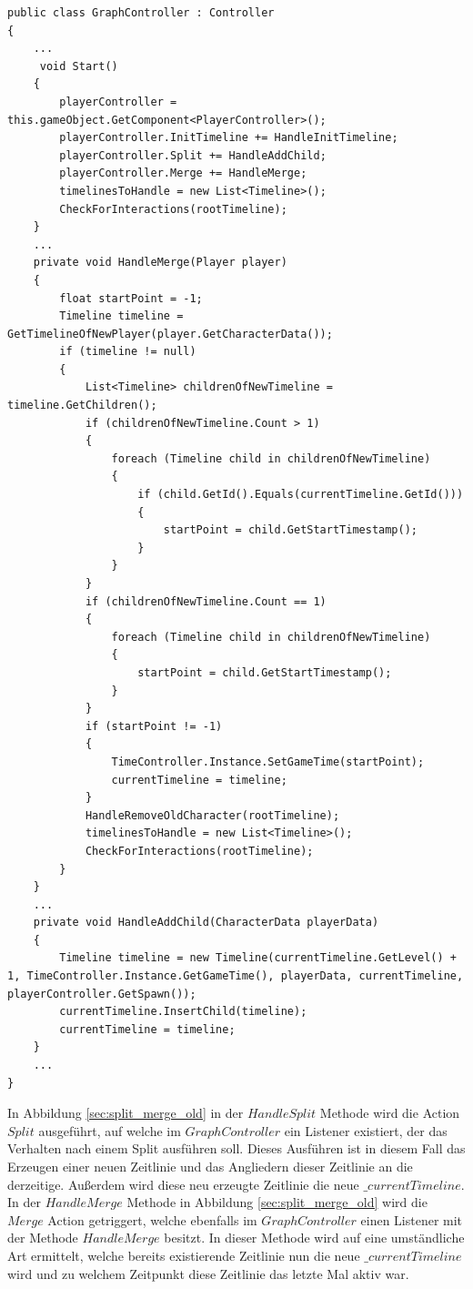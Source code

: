 \begin{lstlisting}[caption={Split und Merge listener}, label={sec:split_merge_old_graph}]
public class GraphController : Controller
{
    ...
     void Start()
    {
        playerController = this.gameObject.GetComponent<PlayerController>();
        playerController.InitTimeline += HandleInitTimeline;
        playerController.Split += HandleAddChild;
        playerController.Merge += HandleMerge;
        timelinesToHandle = new List<Timeline>();
        CheckForInteractions(rootTimeline);
    }
    ...
    private void HandleMerge(Player player)
    {
        float startPoint = -1;
        Timeline timeline = GetTimelineOfNewPlayer(player.GetCharacterData());
        if (timeline != null)
        {
            List<Timeline> childrenOfNewTimeline = timeline.GetChildren();
            if (childrenOfNewTimeline.Count > 1)
            {
                foreach (Timeline child in childrenOfNewTimeline)
                {
                    if (child.GetId().Equals(currentTimeline.GetId()))
                    {
                        startPoint = child.GetStartTimestamp();
                    }
                }
            }
            if (childrenOfNewTimeline.Count == 1)
            {
                foreach (Timeline child in childrenOfNewTimeline)
                {
                    startPoint = child.GetStartTimestamp();
                }
            }
            if (startPoint != -1)
            {
                TimeController.Instance.SetGameTime(startPoint);
                currentTimeline = timeline;
            }
            HandleRemoveOldCharacter(rootTimeline);
            timelinesToHandle = new List<Timeline>();
            CheckForInteractions(rootTimeline);
        }
    }
    ...
    private void HandleAddChild(CharacterData playerData)
    {
        Timeline timeline = new Timeline(currentTimeline.GetLevel() + 1, TimeController.Instance.GetGameTime(), playerData, currentTimeline, playerController.GetSpawn());
        currentTimeline.InsertChild(timeline);
        currentTimeline = timeline;
    }
    ...
}
\end{lstlisting}

In Abbildung \ref{sec:split_merge_old} in der $HandleSplit$ Methode wird die Action $Split$ ausgeführt, auf welche im $GraphController$ ein Listener existiert, der das Verhalten nach einem Split ausführen soll. Dieses Ausführen ist in diesem Fall das Erzeugen einer neuen Zeitlinie und das Angliedern dieser Zeitlinie an die derzeitige. Außerdem wird diese neu erzeugte Zeitlinie die neue $\_currentTimeline$.
In der $HandleMerge$ Methode in Abbildung \ref{sec:split_merge_old} wird die $Merge$ Action getriggert, welche ebenfalls im $GraphController$ einen Listener mit der Methode $HandleMerge$ besitzt. In dieser Methode wird auf eine umständliche Art ermittelt, welche bereits existierende Zeitlinie nun die neue $\_currentTimeline$ wird und zu welchem Zeitpunkt diese Zeitlinie das letzte Mal aktiv war. 

